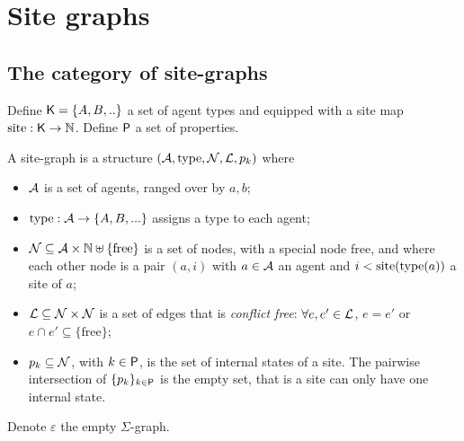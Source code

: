 \section{Site graphs}

\subsection{The category of site-graphs}

Define $\mathsf{K} = \{A, B,..\}$ a set of agent types %
and equipped with a site map $\operatorname{site}:\mathsf{K}\to\mathbb{N}$.
Define $\mathsf{P}$ a set of properties.


\begin{definition}
A site-graph is a structure $(\mathcal{A},\operatorname{type},\mathcal{N},\mathcal{L},p_k)$ where
\begin{itemize}
\item $\mathcal{A}$ is a set of agents, ranged over by $a,b$;
\item $\operatorname{type}:\mathcal{A}\to \{A, B,...\}$ assigns a type to each agent;
\item $\mathcal{N}\subseteq \mathcal{A}\times\mathbb{N}\uplus\{\text{free}\}$ is a set of nodes, with a special node free, and where each other node is a pair $(a,i)$ with $a\in\mathcal{A}$ an agent and $i<\operatorname{site}(\operatorname{type}(a))$ a site of $a$;
\item $\mathcal{L}\subseteq \mathcal{N}\times\mathcal{N}$ is a set of edges that is \emph{conflict free}: $\forall e,e'\in\mathcal{L}$, $e=e'$ or $e\cap e' \subseteq \{\text{free}\}$;
\item $p_k\subseteq\mathcal{N}$, with $k\in\mathsf{P}$, is the set of internal states of a site. The pairwise intersection of $\{p_k\}_{k\in\mathsf{P}}$ is the empty set, that is a site can only have one internal state.
\end{itemize}
Denote $\varepsilon$ the empty $\Sigma$-graph.
\end{definition}


